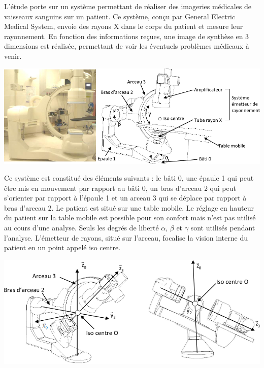 \documentclass[10pt,fleqn]{article} %
\begin{document}

\vspace{8cm}
\pagestyle{fancy}
\thispagestyle{plain}

\def\columnseprulecolor{\color{ocre}}
\setlength{\columnseprule}{0.4pt} 

\def\pathfig{images}

\begin{multicols}{2}
L'étude porte sur un système permettant de réaliser des imageries médicales de vaisseaux sanguins sur un patient. Ce système, conçu par General Electric Medical System, envoie des rayons X dans le corps du patient et mesure leur rayonnement. En fonction des informations reçues, une image de synthèse en 3 dimensions est réalisée, permettant de voir les éventuels problèmes médicaux à venir. 


\begin{center}
\includegraphics[width=\linewidth]{images/fig_02}
\end{center}

 Ce système est constitué des éléments suivants : le bâti 0, une épaule 1 qui peut être mis en mouvement par rapport au bâti 0, un bras d’arceau 2 qui peut s’orienter par rapport à l’épaule 1 et un arceau 3 qui se déplace par rapport à bras d’arceau 2. Le patient est situé sur une table mobile. Le réglage en hauteur du patient sur la table mobile est possible pour son confort mais n'est pas utilisé au cours d'une analyse. Seuls les degrés de liberté $\alpha$, $\beta$ et $\gamma$ sont utilisés pendant l’analyse. L'émetteur de rayons, situé sur l'arceau, focalise la vision interne du patient en un point appelé iso centre. 

\begin{center}
\includegraphics[width=\linewidth]{images/fig_03}
\end{center}


\end{multicols}
\end{document}
